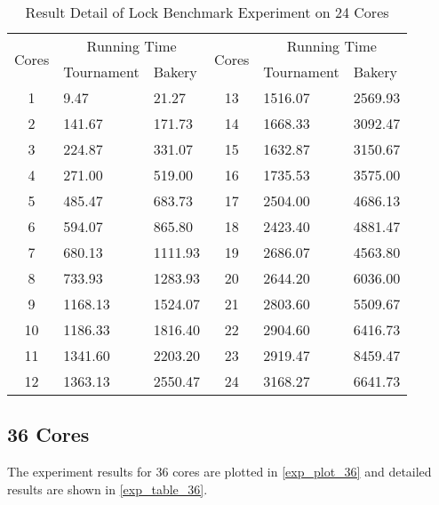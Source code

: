 \documentclass{article}
\begin{document}
\begin{table}[H]
    \caption{Result Detail of Lock Benchmark Experiment on 24 Cores}
    \label{exp_table_24}
    \centering
    \begin{tabular}{c|ll|c|ll}
        \toprule
        \multirow{2}{*}{Cores} & \multicolumn{2}{|c|}{Running Time} &
        \multirow{2}{*}{Cores} & \multicolumn{2}{|c}{Running Time} \\
                               & Tournament & Bakery & & Tournament & Bakery \\\midrule
        1 & 9.47 & 21.27 & 13 & 1516.07 & 2569.93 \\
        2 & 141.67 & 171.73 & 14 & 1668.33 & 3092.47 \\
        3 & 224.87 & 331.07 & 15 & 1632.87 & 3150.67 \\
        4 & 271.00 & 519.00 & 16 & 1735.53 & 3575.00 \\
        5 & 485.47 & 683.73 & 17 & 2504.00 & 4686.13 \\
        6 & 594.07 & 865.80 & 18 & 2423.40 & 4881.47 \\
        7 & 680.13 & 1111.93 & 19 & 2686.07 & 4563.80 \\
        8 & 733.93 & 1283.93 & 20 & 2644.20 & 6036.00 \\
        9 & 1168.13 & 1524.07 & 21 & 2803.60 & 5509.67 \\
        10 & 1186.33 & 1816.40 & 22 & 2904.60 & 6416.73 \\
        11 & 1341.60 & 2203.20 & 23 & 2919.47 & 8459.47 \\
        12 & 1363.13 & 2550.47 & 24 & 3168.27 & 6641.73 \\
        \bottomrule
    \end{tabular}
\end{table}


\subsection*{36 Cores}
The experiment results for 36 cores are plotted in \cref{exp_plot_36} and detailed
results are shown in \cref{exp_table_36}.
\end{document}
